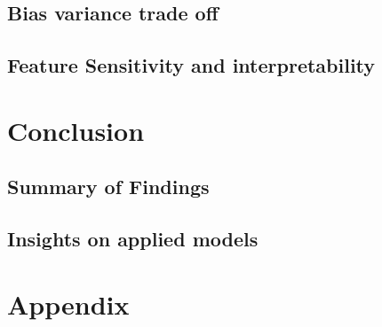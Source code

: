 \documentclass[10pt,twocolumn]{article}
\begin{document}
\subsection{Bias variance trade off}

\subsection{Feature Sensitivity and interpretability}


\section{Conclusion}
\subsection{Summary of Findings}
\subsection{Insights on applied models}


\clearpage  %
\appendix
\section*{Appendix}
\end{document}
